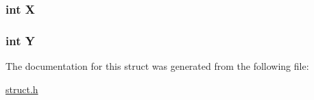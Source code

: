 \subsubsection[{\texorpdfstring{X}{X}}]{\setlength{\rightskip}{0pt plus 5cm}int X}\hypertarget{struct___node_a80c0944640e62d3ed6c5419c1bcc0c88}{}\label{struct___node_a80c0944640e62d3ed6c5419c1bcc0c88}
\subsubsection[{\texorpdfstring{Y}{Y}}]{\setlength{\rightskip}{0pt plus 5cm}int Y}\hypertarget{struct___node_aa482c4cc86a24474e4fb19b5b5978778}{}\label{struct___node_aa482c4cc86a24474e4fb19b5b5978778}


The documentation for this struct was generated from the following file\+:\begin{DoxyCompactItemize}
\item 
\hyperlink{struct_8h}{struct.\+h}\end{DoxyCompactItemize}
